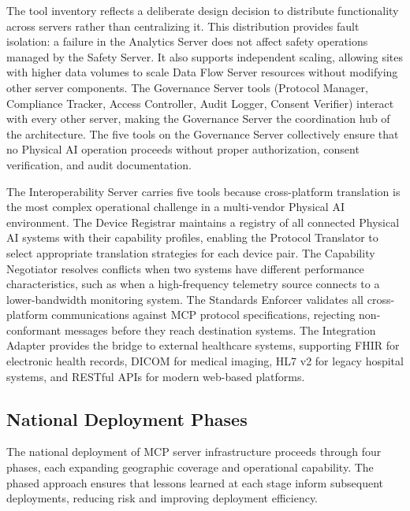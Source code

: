 The tool inventory reflects a deliberate design decision to distribute
functionality across servers rather than centralizing it. This distribution
provides fault isolation: a failure in the Analytics Server does not affect
safety operations managed by the Safety Server. It also supports independent
scaling, allowing sites with higher data volumes to scale Data Flow Server
resources without modifying other server components. The Governance Server tools
(Protocol Manager, Compliance Tracker, Access Controller, Audit Logger, Consent
Verifier) interact with every other server, making the Governance Server the
coordination hub of the architecture. The five tools on the Governance Server
collectively ensure that no Physical AI operation proceeds without proper
authorization, consent verification, and audit documentation.

The Interoperability Server carries five tools because cross-platform
translation is the most complex operational challenge in a multi-vendor Physical
AI environment. The Device Registrar maintains a registry of all connected
Physical AI systems with their capability profiles, enabling the Protocol
Translator to select appropriate translation strategies for each device pair.
The Capability Negotiator resolves conflicts when two systems have different
performance characteristics, such as when a high-frequency telemetry source
connects to a lower-bandwidth monitoring system. The Standards Enforcer
validates all cross-platform communications against MCP protocol specifications,
rejecting non-conformant messages before they reach destination systems. The
Integration Adapter provides the bridge to external healthcare systems,
supporting FHIR \cite{hl7-fhir} for electronic health records, DICOM
\cite{dicom} for medical imaging, HL7 v2 for legacy hospital systems, and
RESTful APIs for modern web-based platforms.

\subsection{National Deployment Phases}
\label{subsec:mcp-deployment-phases}

The national deployment of MCP server infrastructure proceeds through four
phases, each expanding geographic coverage and operational capability. The
phased approach ensures that lessons learned at each stage inform subsequent
deployments, reducing risk and improving deployment efficiency.

